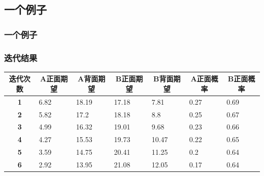 \documentclass[UTF8]{ctexbeamer}
\numberwithin{equation}{section}  %
\begin{document}
\subsection{一个例子}
\begin{frame}
    \frametitle{一个例子}
    \exampleCode
\end{frame}

\begin{frame}
    \frametitle{迭代结果}
\begin{table}[htbp]
    \centering
\begin{tabular}{cllllll}
        \toprule
\textbf{迭代次数} & \multicolumn{1}{c}{\textbf{A正面期望}} & \multicolumn{1}{c}{\textbf{A背面期望}} & \multicolumn{1}{c}{\textbf{B正面期望}} & \multicolumn{1}{c}{\textbf{B背面期望}} & \multicolumn{1}{c}{\textbf{A正面概率}} & \multicolumn{1}{c}{\textbf{B正面概率}} \\
        \midrule
\textbf{1}    & 6.82                               & 18.19                              & 17.18                              & 7.81                               & 0.27                               & 0.69                               \\
        \midrule
\textbf{2}    & 5.82                               & 17.2                               & 18.18                              & 8.8                                & 0.25                               & 0.67                               \\
        \midrule
\textbf{3}    & 4.99                               & 16.32                              & 19.01                              & 9.68                               & 0.23                               & 0.66                               \\
        \midrule
\textbf{4}    & 4.27                               & 15.53                              & 19.73                              & 10.47                              & 0.22                               & 0.65                               \\
        \midrule
\textbf{5}    & 3.59                               & 14.75                              & 20.41                              & 11.25                              & 0.2                                & 0.64                               \\
        \midrule
\textbf{6}    & 2.92                               & 13.95                              & 21.08                              & 12.05                              & 0.17                               & 0.64                               \\

\end{tabular}
\end{table}
\end{frame}
\end{document}

